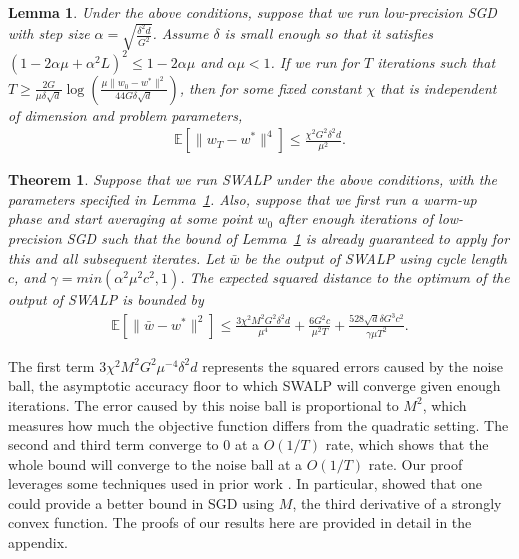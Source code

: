 \documentclass{article}
\newtheorem{theorem}{Theorem}
\newtheorem{lemma}{Lemma}
\begin{document}
\begin{lemma}
\label{lemmaNoiseBall}
Under the above conditions, 
suppose that we run low-precision SGD with step size $\alpha = \sqrt{\frac{\delta^2 d}{G^2}}$. 
Assume $\delta$ is small enough so that it satisfies $(1-2\alpha\mu+\alpha^2L)^2 \leq 1-2\alpha\mu$ and $\alpha\mu < 1$.
If we run for $T$ iterations such that   
$ T \geq \frac{2G}{\mu\delta\sqrt{d}}\log{\left( \frac{\mu\|w_0 - w^*\|^2}{44G\delta\sqrt{d}} \right)}$, 
then for some fixed constant $\chi$ that is independent of dimension and problem parameters, 
\begin{align*}
{\textstyle
\mathbb{E}[\|w_T - w^*\|^4] \leq \frac{\chi^2 G^2\delta^2d}{\mu^2}.
}
\end{align*}
\end{lemma}

\begin{theorem}
\label{thm:SWALP}
Suppose that we run SWALP under the above conditions, with the parameters specified in Lemma~\ref{lemmaNoiseBall}.
Also, suppose that we first run a warm-up phase and start averaging at some point $w_0$ after enough iterations of low-precision SGD such that the bound of Lemma~\ref{lemmaNoiseBall} is already guaranteed to apply for this and all subsequent iterates.
Let $\bar{w}$ be the output of SWALP using cycle length $c$, and $\gamma = min(\alpha^2\mu^2c^2,1)$.
The expected squared distance to the optimum of the output of SWALP is bounded by
\begin{align*}
{\textstyle
    \mathbb{E}[\|\bar{w} - w^*\|^2] \leq
    \frac{3 \chi^2 M^2G^2\delta^2 d}{\mu^4} + 
    \frac{6 G^2 c}{\mu^2 T} +
    \frac{528 \sqrt{d}\delta G^3 c^2}{\gamma\mu T^2}.
}
\end{align*}
\end{theorem}

The first term $3\chi^2M^2G^2 \mu^{-4} \delta^2 d$ represents the squared errors caused by the noise ball, the asymptotic accuracy floor to which SWALP will converge given enough iterations.
The error caused by this noise ball is proportional to $M^2$, which measures how much the objective function differs from the quadratic setting. 
The second and third term converge to $0$ at a $O(1/T)$ rate, which shows that the whole bound will converge to the noise ball at a $O(1/T)$ rate.
Our proof leverages some techniques used in prior work \cite{francisbach}. 
In particular, \citet{francisbach} showed that one could provide a better bound in SGD using $M$, the third derivative of a strongly convex function.
The proofs of our results here are provided in detail in the appendix.
\end{document}
